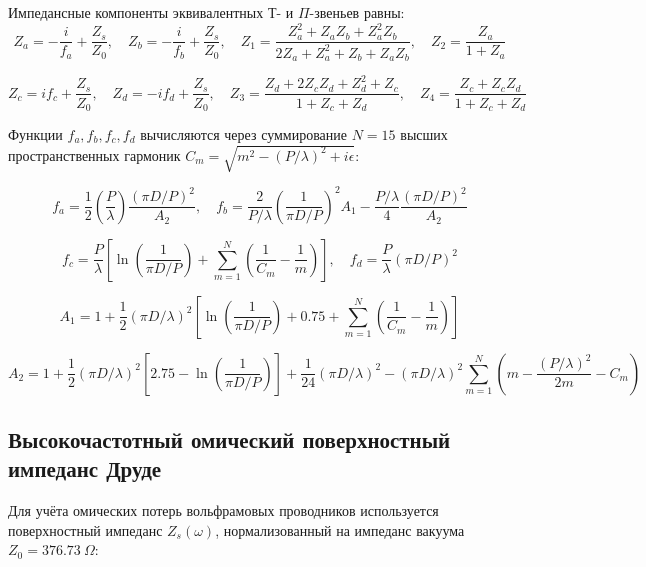 \documentclass[12pt,a4paper]{article}
\begin{document}
Импедансные компоненты эквивалентных Т- и $\Pi$-звеньев равны:
\begin{equation}
Z_a = -\frac{i}{f_a} + \frac{Z_s}{Z_0}, \quad Z_b = -\frac{i}{f_b} + \frac{Z_s}{Z_0}, \quad Z_1 = \frac{Z_a^2 + Z_a Z_b + Z_a^2 Z_b}{2 Z_a + Z_a^2 + Z_b + Z_a Z_b}, \quad Z_2 = \frac{Z_a}{1 + Z_a}
\end{equation}

\begin{equation}
Z_c = i f_c + \frac{Z_s}{Z_0}, \quad Z_d = -i f_d + \frac{Z_s}{Z_0}, \quad Z_3 = \frac{Z_d + 2 Z_c Z_d + Z_d^2 + Z_c}{1 + Z_c + Z_d}, \quad Z_4 = \frac{Z_c + Z_c Z_d}{1 + Z_c + Z_d}
\end{equation}

Функции $f_a, f_b, f_c, f_d$ вычисляются через суммирование $N=15$ высших пространственных гармоник $C_m = \sqrt{m^2 - (P/\lambda)^2 + i\epsilon}$:

\begin{equation}
f_a = \frac{1}{2} \left(\frac{P}{\lambda}\right) \frac{(\pi D/P)^2}{A_2}, \quad f_b = \frac{2}{P/\lambda} \left(\frac{1}{\pi D/P}\right)^2 A_1 - \frac{P/\lambda}{4} \frac{(\pi D/P)^2}{A_2}
\end{equation}

\begin{equation}
f_c = \frac{P}{\lambda} \left[ \ln\left(\frac{1}{\pi D/P}\right) + \sum_{m=1}^{N} \left(\frac{1}{C_m} - \frac{1}{m}\right) \right], \quad f_d = \frac{P}{\lambda} (\pi D/P)^2
\end{equation}

\begin{equation}
A_1 = 1 + \frac{1}{2} (\pi D/\lambda)^2 \left[\ln\left(\frac{1}{\pi D/P}\right) + 0.75 + \sum_{m=1}^{N} \left(\frac{1}{C_m} - \frac{1}{m}\right)\right]
\end{equation}

\begin{equation}
A_2 = 1 + \frac{1}{2} (\pi D/\lambda)^2 \left[2.75 - \ln\left(\frac{1}{\pi D/P}\right)\right] + \frac{1}{24}(\pi D/\lambda)^2 - (\pi D/\lambda)^2 \sum_{m=1}^{N} \left(m - \frac{(P/\lambda)^2}{2m} - C_m\right)
\end{equation}

\subsection{Высокочастотный омический поверхностный импеданс Друде}
Для учёта омических потерь вольфрамовых проводников используется поверхностный импеданс $Z_s(\omega)$, нормализованный на импеданс вакуума $Z_0 = 376.73\ \Omega$:
\end{document}
